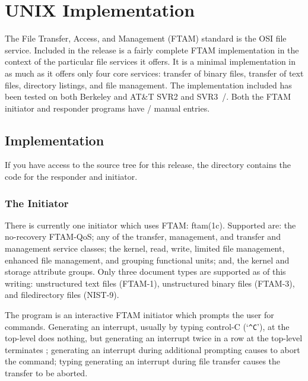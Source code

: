 
\chapter	{UNIX Implementation}\label{unixftam}
The File Transfer, Access, and Management (FTAM) standard is the OSI file
service.
Included in the release is a fairly complete FTAM implementation in the
context of the particular file services it offers.
It is a minimal implementation in as much as it offers only four core
services: transfer of binary files,
transfer of text files,
directory listings,
and file management.
The implementation included has been tested on both Berkeley and AT\&T
SVR2 and SVR3~\unix/.
Both the FTAM initiator and responder programs have \unix/ manual entries.

\section	{Implementation}\label{unixftam:code}
If you have access to the source tree for this release,
the directory  contains the code for the responder and initiator.

\subsection	{The Initiator}
There is currently one initiator which uses FTAM: \man ftam(1c).
Supported are:
the no-recovery FTAM-QoS;
any of 
the transfer, management, and transfer and management service classes;
the kernel, read, write, limited file management, enhanced file management, and
grouping functional units;
and, the kernel and storage attribute groups.
Only three document types are supported as of this writing:
unstructured text files (FTAM-1),
unstructured binary files (FTAM-3),
and filedirectory files (NIST-9).

The  program is an interactive FTAM initiator
which prompts the user for commands.
Generating an interrupt,
usually by typing control-C (`\verb"^C"'),
at the top-level does nothing,
but generating an interrupt twice in a row at the top-level terminates
;
generating an interrupt during additional prompting causes  to abort
the command;
typing generating an interrupt during file transfer causes the transfer to be
aborted.

